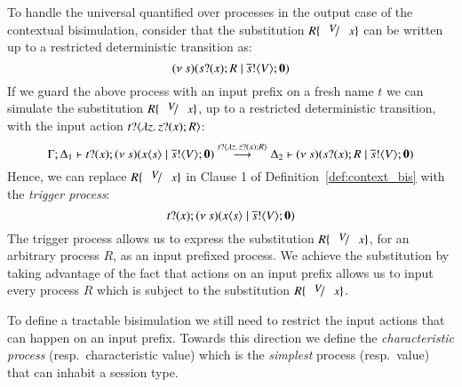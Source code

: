 To handle the universal quantified over processes in the output
case of the contextual bisimulation, consider that
the substitution $R \subst{V}{x}$ can be written up to 
a restricted deterministic transition as:
%
\[
	(\nu\ s)(s ? (x) ; R \;|\; \overline{s} ! \langle V \rangle ; \mathbf{0})
\]
%
If we guard the above process with an input prefix
on a fresh name $t$ we can simulate the 
substitution $R \subst{V}{x}$, up to a restricted
deterministic transition, with the input action
$t ? \langle \lambda z.\,z ? (x) ; R \rangle$:
%
\[
	\Gamma; \Delta_1 \vdash t ? (x) ; (\nu\ s)(x\langle s \rangle \;|\; \overline{s} ! \langle V \rangle ; \mathbf{0}) \stackrel{t ? \langle \lambda z.\,z ? (x) ; R \rangle}{\longrightarrow} \Delta_2 \vdash (\nu\ s)(s ? (x) ; R \;|\; \overline{s} ! \langle V \rangle ; \mathbf{0})
\]
%
Hence, we can replace $R \subst{V}{x}$ in Clause 1
of Definition~\ref{def:context_bis}
with the {\em trigger process}:
%
\[
	t ? (x) ; (\nu\ s)(x\langle s \rangle \;|\; \overline{s} ! \langle V \rangle ; \mathbf{0})
\]
%
\noi The trigger process allows us to express the
substitution $R \subst{V}{x}$, for an arbitrary process
$R$, as an input prefixed process.
We achieve the substitution by taking
advantage of the fact that actions on an input
prefix allows us to input every process $R$
which is subject to the substitution $R \subst{V}{x}$.

To define a tractable bisimulation we still need to
restrict the input actions that can happen on an input
prefix.
Towards this direction we define the
{\em characteristic process} (resp.~characteristic value)
which is the
{\em simplest} process (resp.~value) that can inhabit 
a session type.

